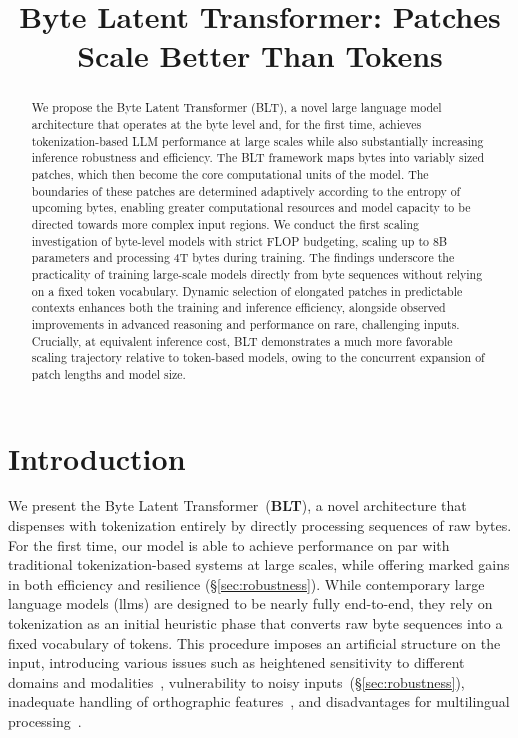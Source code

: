 \title{Byte Latent Transformer: Patches Scale Better Than Tokens}

\begin{abstract}
We propose the Byte Latent Transformer ({\textsc BLT}), a novel large language model architecture that operates at the byte level and, for the first time, achieves tokenization-based LLM performance at large scales while also substantially increasing inference robustness and efficiency. The {\textsc BLT} framework maps bytes into variably sized patches, which then become the core computational units of the model. The boundaries of these patches are determined adaptively according to the entropy of upcoming bytes, enabling greater computational resources and model capacity to be directed towards more complex input regions. We conduct the first scaling investigation of byte-level models with strict FLOP budgeting, scaling up to 8B parameters and processing 4T bytes during training. The findings underscore the practicality of training large-scale models directly from byte sequences without relying on a fixed token vocabulary. Dynamic selection of elongated patches in predictable contexts enhances both the training and inference efficiency, alongside observed improvements in advanced reasoning and performance on rare, challenging inputs. Crucially, at equivalent inference cost, {\textsc BLT} demonstrates a much more favorable scaling trajectory relative to token-based models, owing to the concurrent expansion of patch lengths and model size.
\end{abstract}

\section{Introduction}
\label{section:intro}

We present the Byte Latent Transformer~(\textbf{BLT}), a novel architecture that dispenses with tokenization entirely by directly processing sequences of raw bytes. For the first time, our model is able to achieve performance on par with traditional tokenization-based systems at large scales, while offering marked gains in both efficiency and resilience (\S\ref{sec:robustness}). While contemporary large language models (llms) are designed to be nearly fully end-to-end, they rely on tokenization as an initial heuristic phase that converts raw byte sequences into a fixed vocabulary of tokens. This procedure imposes an artificial structure on the input, introducing various issues such as heightened sensitivity to different domains and modalities~\citep{dagangetting}, vulnerability to noisy inputs~(\S\ref{sec:robustness}), inadequate handling of orthographic features~\citep{edman2024cute}, and disadvantages for multilingual processing~\citep{liang2023xlm,petrov2024language,limisiewicz2024myte}.

